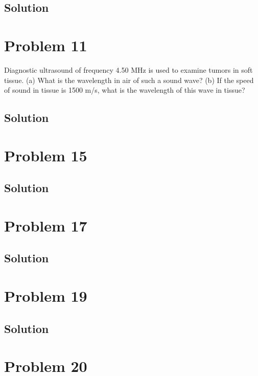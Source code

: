 \documentclass[12pt]{article}
\begin{document}
        \subsection{Solution}

    \pagebreak
    \section{Problem 11}
        Diagnostic ultrasound of frequency 4.50 MHz is used to examine tumors in soft tissue. 
        (a) What is the wavelength in air of such a sound wave? 
        (b) If the speed of sound in tissue is 1500 m/s, what is the wavelength of this wave in tissue?

        \subsection{Solution}

    \pagebreak
    \section{Problem 15}

        \subsection{Solution}

    \pagebreak
    \section{Problem 17}

        \subsection{Solution}

    \pagebreak
    \section{Problem 19}

        \subsection{Solution}

    \pagebreak
    \section{Problem 20}
\end{document}
